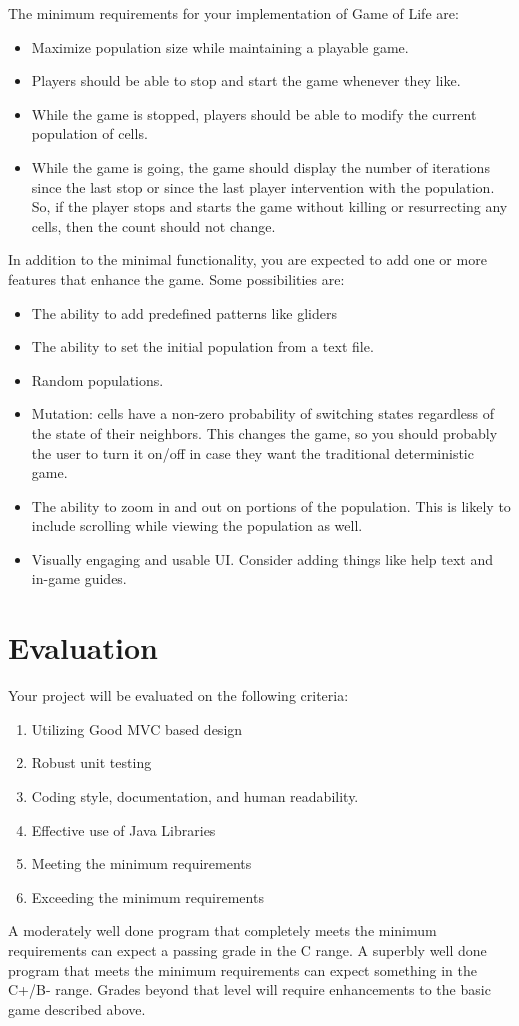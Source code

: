 \documentclass[]{tufte-handout}
\begin{document}
The minimum requirements for your implementation of Game of Life are:
\begin{itemize}
\item Maximize population size while maintaining a playable game. 
\item Players should be able to stop and start the game whenever they like.
\item While the game is stopped, players should be able to modify the current population of cells.
\item While the game is going, the game should display the number of iterations since the last stop or since the last player intervention with the population.  So, if the player stops and starts the game without killing or resurrecting any cells, then the count should not change. 
\end{itemize}  
In addition to the minimal functionality, you are expected to add one or more features that enhance the game. Some possibilities are:
\begin{itemize}
\item The ability to add predefined patterns like gliders
\item The ability to set the initial population from a text file.
\item Random populations.
\item Mutation: cells have a non-zero probability of switching states regardless of the state of their neighbors. This changes the game, so you should probably the user to turn it on/off in case they want the traditional deterministic game.
\item The ability to zoom in and out on portions of the population. This is likely to include scrolling while viewing the population as well.
\item Visually engaging and usable UI. Consider adding things like help text and in-game guides.
\end{itemize}


\section{Evaluation}

Your project will be evaluated on the following criteria:
\begin{enumerate}
\item Utilizing Good MVC based design
\item Robust unit testing 
\item Coding style, documentation, and human readability.
\item Effective use of Java Libraries
\item Meeting the minimum requirements
\item Exceeding the minimum requirements
\end{enumerate}
A moderately well done program that completely meets the minimum requirements can expect a passing grade in the C range.  A superbly well done program that meets the minimum requirements can expect something in the C+/B- range.  Grades beyond that level will require enhancements to the basic game described above. 
\end{document}
